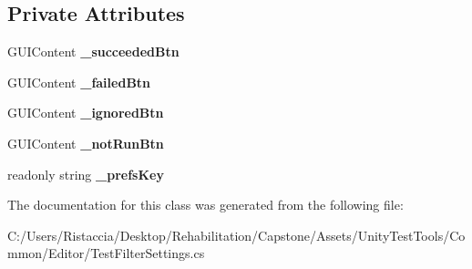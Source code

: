 \subsection*{Private Attributes}
\begin{DoxyCompactItemize}
\item 
\mbox{\label{class_unity_test_1_1_test_filter_settings_ae87a29216912ce5371421c6c0d417a12}} 
G\+U\+I\+Content {\bfseries \+\_\+succeeded\+Btn}
\item 
\mbox{\label{class_unity_test_1_1_test_filter_settings_aeb6e237dabdb624014b77478642aee24}} 
G\+U\+I\+Content {\bfseries \+\_\+failed\+Btn}
\item 
\mbox{\label{class_unity_test_1_1_test_filter_settings_a9de10b548d41709cd78cf7288ae9a663}} 
G\+U\+I\+Content {\bfseries \+\_\+ignored\+Btn}
\item 
\mbox{\label{class_unity_test_1_1_test_filter_settings_a442bffbb9687d4e0de5edadc2a0ae755}} 
G\+U\+I\+Content {\bfseries \+\_\+not\+Run\+Btn}
\item 
\mbox{\label{class_unity_test_1_1_test_filter_settings_a72081133d1d6eaa3ac954254e54c70db}} 
readonly string {\bfseries \+\_\+prefs\+Key}
\end{DoxyCompactItemize}


The documentation for this class was generated from the following file\+:\begin{DoxyCompactItemize}
\item 
C\+:/\+Users/\+Ristaccia/\+Desktop/\+Rehabilitation/\+Capstone/\+Assets/\+Unity\+Test\+Tools/\+Common/\+Editor/Test\+Filter\+Settings.\+cs\end{DoxyCompactItemize}
